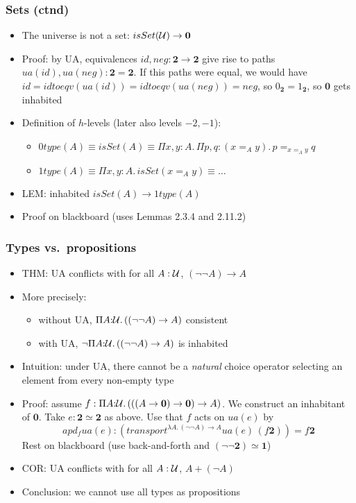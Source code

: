 \documentclass[handout]{beamer}
\newcommand{\depi}[3]{\Pi{#1{:}#2.\,#3}}
\newcommand{\sigm}[3]{\Sigma{#1{:}#2.\,#3}}
\newcommand{\lam}[2]{\lambda{#1.\,#2}}
\newcommand{\UU}{{\cal U}}
\newcommand{\bfnull}{\mathbf{0}}
\newcommand{\bfone}{\mathbf{1}}
\newcommand{\bftwo}{\mathbf{2}}
\begin{document}
 \frame
  {

    \frametitle{Sets (ctnd)}

    \begin{itemize}[<+->]
    \item The universe is not a set: $isSet(\UU)\to\bfnull$
    \item Proof: by UA, equivalences $id,neg:  \bftwo\to\bftwo$ give rise
          to paths $ua(id),ua(neg):\bftwo=\bftwo$. If this paths
         were equal, we would have 
         $id=idtoeqv(ua(id))=idtoeqv(ua(neg))=neg$, so $0_ {\bftwo} =  1_ {\bftwo}$,
         so $\bfnull$ gets inhabited       
    \item Definition of $h$-levels (later also levels $-2,-1$):
      \begin{itemize}[<+->]   
      \item $0type(A)\equiv isSet(A) \equiv \depi{x,y}{A}{\depi{p,q}{(x=_Ay)}{p=_{x=_Ay}q}}$
      \item $1type(A)\equiv \depi{x,y}{A}{isSet(x=_Ay)} \equiv \ldots$
      \end{itemize}   
    \item LEM: inhabited $isSet(A)\to 1type(A)$
    \item Proof on blackboard (uses Lemmas 2.3.4 and 2.11.2)
    \end{itemize}
  }

 \frame
  {

    \frametitle{Types vs.\ propositions}

    \begin{itemize}[<+->]
    \item THM: UA conflicts with for all $A:\UU$, $(\neg \neg A) \to A$
    \item More precisely:
      \begin{itemize}[<+->]   
      \item without UA, $\depi{A}{\UU}{((\neg \neg A) \to A)}$ consistent
      \item with UA, $\neg\depi{A}{\UU}{((\neg \neg A) \to A)}$ is inhabited
      \end{itemize}   
    \item Intuition: under UA, there cannot be a \emph{natural} choice
          operator selecting an element from every non-empty type
    \item Proof: assume $f:\depi{A}{\UU}{(((A\to\bfnull)\to\bfnull)\to A)}$.
          We construct an inhabitant of $\bfnull$. 
          Take $e: \bftwo\simeq\bftwo$ as above.
          Use that $f$ acts on $ua(e)$ by 
          \[apd_f ua(e): (transport^{\lam{A}{(\neg \neg A) \to A}}ua(e)\,(f\bftwo)) = f\bftwo\]
          Rest on blackboard (use back-and-forth and $(\neg\neg\bftwo)\simeq\bfone$)
    \item COR: UA conflicts with for all $A:\UU$, $A + (\neg A)$
    \item Conclusion: we cannot use all types as propositions
    \end{itemize}
  }
\end{document}
